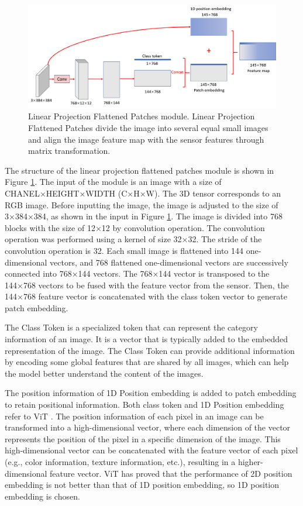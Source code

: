 \documentclass[acmsmall, screen]{acmart}
\begin{document}
\begin{figure}[htbp]
  \centering
  \includegraphics[width=\linewidth]{pic/linear_projection_flattened_patches_module.png}
  \caption{Linear Projection Flattened Patches module. Linear Projection Flattened Patches divide the image into several equal small images and align the image feature map with the sensor features through matrix transformation.}
  \label{linear_projection}
\end{figure}

The structure of the linear projection flattened patches module is shown in Figure \ref{linear_projection}. The input of the module is an image with a size of CHANEL×HEIGHT×WIDTH (C×H×W). The 3D tensor corresponds to an RGB image. Before inputting the image, the image is adjusted to the size of 3×384×384, as shown in the input in Figure \ref{linear_projection}. The image is divided into 768 blocks with the size of 12×12 by convolution operation. The convolution operation was performed using a kernel of size 32×32. The stride of the convolution operation is 32. Each small image is flattened into 144 one-dimensional vectors, and 768 flattened one-dimensional vectors are successively connected into 768×144 vectors. The 768×144 vector is transposed to the 144×768 vectors to be fused with the feature vector from the sensor. Then, the 144×768 feature vector is concatenated with the class token vector to generate patch embedding. 

The Class Token is a specialized token that can represent the category information of an image. It is a vector that is typically added to the embedded representation of the image. The Class Token can provide additional information by encoding some global features that are shared by all images, which can help the model better understand the content of the images.

The position information of 1D Position embedding is added to patch embedding to retain positional information. Both class token and 1D Position embedding refer to ViT \cite{dosovitskiy_image_2021}. The position information of each pixel in an image can be transformed into a high-dimensional vector, where each dimension of the vector represents the position of the pixel in a specific dimension of the image. This high-dimensional vector can be concatenated with the feature vector of each pixel (e.g., color information, texture information, etc.), resulting in a higher-dimensional feature vector. ViT has proved that the performance of 2D position embedding is not better than that of 1D position embedding, so 1D position embedding is chosen. 
\end{document}

